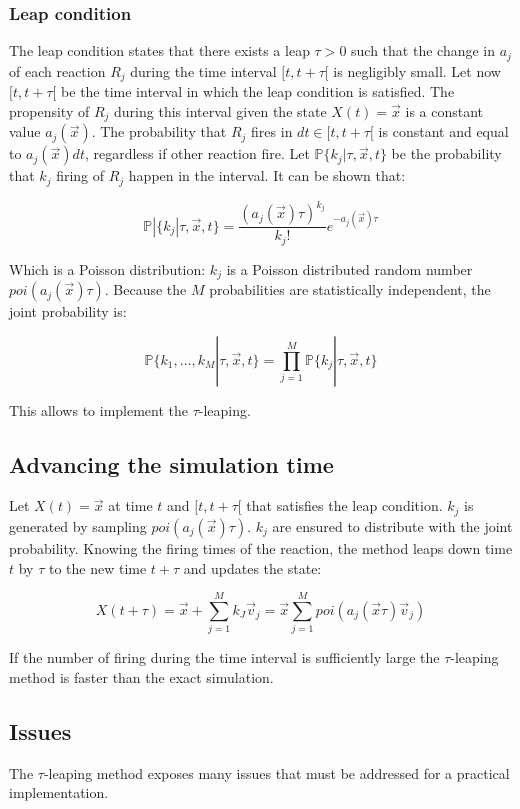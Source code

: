     \subsubsection{Leap condition}
    The leap condition states that there exists a leap $\tau>0$ such that the change in $a_j$ of each reaction $R_j$ during the time interval $[t, t+\tau[$ is negligibly small.
    Let now $[t, t+\tau[$ be the time interval in which the leap condition is satisfied.
    The propensity of $R_j$ during this interval given the state $X(t) = \vec{x}$ is a constant value $a_j(\vec{x})$.
    The probability that $R_j$ fires in $dt\in [t, t+\tau[$ is constant and equal to $a_j(\vec{x})dt$, regardless if other reaction fire.
    Let $\mathbb{P}\{k_j|\tau,\vec{x},t\}$ be the probability that $k_j$ firing of $R_j$ happen in the interval.
    It can be shown that:

    $$\mathbb{P}|\{k_j|\tau,\vec{x},t\} = \frac{(a_j(\vec{x})\tau)^{k_j}}{k_j!}e^{-a_j(\vec{x})\tau}$$

    Which is a Poisson distribution: $k_j$ is a Poisson distributed random number $poi(a_j(\vec{x})\tau)$.
    Because the $M$ probabilities are statistically independent, the joint probability is:

    $$\mathbb{P}\{k_1,\dots,k_M|\tau, \vec{x},t\} = \prod\limits_{j=1}^M\mathbb{P}\{k_j|\tau,\vec{x},t\}$$

    This allows to implement the $\tau$-leaping.

  \subsection{Advancing the simulation time}
  Let $X(t) = \vec{x}$ at time $t$ and $[t,t+\tau[$ that satisfies the leap condition.
  $k_j$ is generated by sampling $poi(a_j(\vec{x})\tau)$.
  $k_j$ are ensured to distribute with the joint probability.
  Knowing the firing times of the reaction, the method leaps down time $t$ by $\tau$ to the new time $t+\tau$ and updates the state:

  $$X(t+\tau) = \vec{x} + \sum\limits_{j=1}^Mk_J\vec{v}_j = \vec{x}\sum\limits_{j=1}^M poi(a_j(\vec{x}\tau)\vec{v}_j)$$

  If the number of firing during the time interval is sufficiently large the $\tau$-leaping method is faster than the exact simulation.

  \subsection{Issues}
  The $\tau$-leaping method exposes many issues that must be addressed for a practical implementation.

